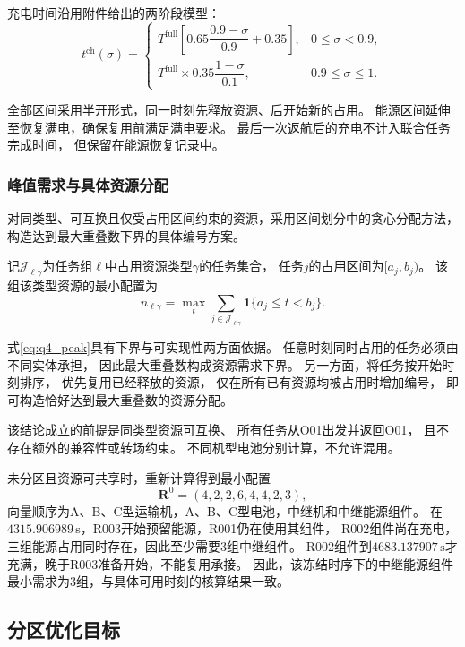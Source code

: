 \documentclass[bwprint]{gmcmthesis}
\begin{document}
充电时间沿用附件给出的两阶段模型：
\begin{equation}
t^{\mathrm{ch}}(\sigma)=
\begin{cases}
T^{\mathrm{full}}
\left[
0.65\dfrac{0.9-\sigma}{0.9}+0.35
\right],
&0\leq \sigma<0.9,\\[2mm]
T^{\mathrm{full}}\times0.35
\dfrac{1-\sigma}{0.1},
&0.9\leq \sigma\leq1.
\end{cases}
\end{equation}

全部区间采用半开形式，同一时刻先释放资源、后开始新的占用。
能源区间延伸至恢复满电，确保复用前满足满电要求。
最后一次返航后的充电不计入联合任务完成时间，
但保留在能源恢复记录中。

\subsubsection{峰值需求与具体资源分配}
对同类型、可互换且仅受占用区间约束的资源，采用区间划分中的贪心分配方法\cite{kleinberg2006}，构造达到最大重叠数下界的具体编号方案。


记$\mathcal{J}_{\ell\gamma}$为任务组$\ell$中占用资源类型$\gamma$的任务集合，
任务$j$的占用区间为$[a_j,b_j)$。
该组该类型资源的最小配置为
\begin{equation}
n_{\ell\gamma}
=
\max_t
\sum_{j\in\mathcal{J}_{\ell\gamma}}
\mathbf{1}\{a_j\leq t<b_j\}.
\label{eq:q4_peak}
\end{equation}

式\eqref{eq:q4_peak}具有下界与可实现性两方面依据。
任意时刻同时占用的任务必须由不同实体承担，
因此最大重叠数构成资源需求下界。
另一方面，将任务按开始时刻排序，
优先复用已经释放的资源，
仅在所有已有资源均被占用时增加编号，
即可构造恰好达到最大重叠数的资源分配。

该结论成立的前提是同类型资源可互换、
所有任务从O01出发并返回O01，
且不存在额外的兼容性或转场约束。
不同机型电池分别计算，不允许混用。

未分区且资源可共享时，重新计算得到最小配置
\begin{equation}
\boldsymbol R^0=(4,2,2,6,4,4,2,3),
\end{equation}
向量顺序为A、B、C型运输机，A、B、C型电池，中继机和中继能源组件。
在$4315.906989\,\mathrm{s}$，R003开始预留能源，R001仍在使用其组件，
R002组件尚在充电，三组能源占用同时存在，因此至少需要3组中继组件。
R002组件到$4683.137907\,\mathrm{s}$才充满，晚于R003准备开始，不能复用承接。
因此，该冻结时序下的中继能源组件最小需求为3组，与具体可用时刻的核算结果一致。

\subsection{分区优化目标}
\end{document}
